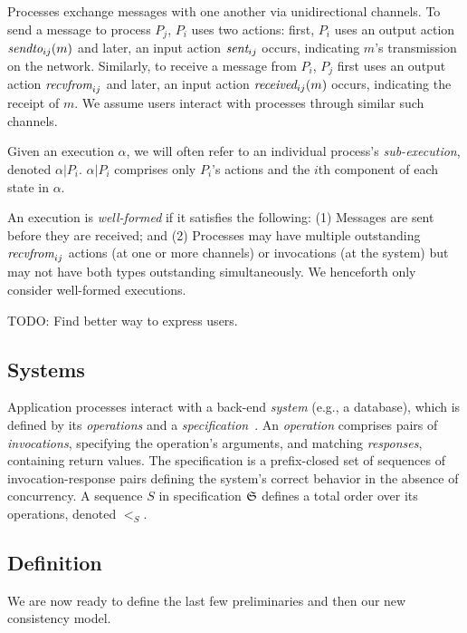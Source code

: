 Processes exchange messages with one another via unidirectional
channels. To send a message to process $P_j$, $P_i$ uses two actions: first,
$P_i$ uses an output action $\operatorname*{\operatorname*{\textit{sendto}}}_{ij}(m)$ and later, an input action
$\operatorname*{\textit{sent}}_{ij}$ occurs, indicating $m$'s transmission on the network. Similarly, to receive a
message from $P_i$, $P_j$ first uses an output action $\operatorname*{\textit{recvfrom}}_{ij}$ and later,
an input action $\operatorname*{\textit{received}}_{ij}(m)$ occurs, indicating the receipt of $m$.
We assume users interact with processes through similar such channels. 

Given an execution $\alpha$, we will often refer to an individual process's
\textit{sub-execution}, denoted $\alpha|P_i$. $\alpha|P_i$ comprises
only $P_i$'s actions and the $i$th component of each state in $\alpha$.

 An execution is \textit{well-formed} if it
satisfies the following: (1) Messages are sent before they are received; and
(2) Processes may have multiple outstanding $\operatorname*{\textit{recvfrom}}_{ij}$ actions
(at one or more channels) or invocations (at the system) but may not have
both types outstanding simultaneously. We henceforth only consider well-formed
executions.

TODO: Find better way to express users.

\subsection{Systems}
\label{sec:mdl:systems}

Application processes interact with a back-end \textit{system} (e.g., a database),
which is defined by its \textit{operations} and a
\textit{specification}~\cite{herlihy1990linearizability,lynch1996da}. An
\textit{operation} comprises pairs of \textit{invocations}, specifying the
operation's arguments, and matching \textit{responses}, containing
return values. The specification is a prefix-closed set of sequences of
invocation-response pairs defining the system's correct behavior in the absence
of concurrency. A sequence $S$ in specification $\mathfrak{S}$ defines a total order
over its operations, denoted $<_S$.

\subsection{Definition}
\label{sec:mdl:def}

We are now ready to define the last few preliminaries and then our new consistency model.

